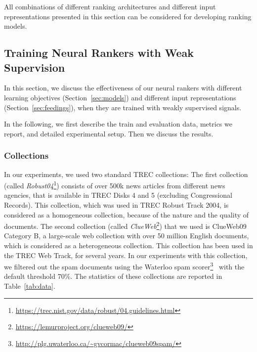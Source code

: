 \medskip
All combinations of different ranking architectures and different input representations presented in this section can be considered for developing ranking models.

\subsection{Training Neural Rankers with Weak Supervision}
\label{sec:neuralranking_expermients}
In this section,  we discuss the effectiveness of our neural rankers with different learning objectives (Section~\ref{sec:models}) and different input representations (Section~\ref{sec:feedings}), when they are trained with weakly supervised signals.

In the following, we first describe the train and evaluation data, metrics we report, and detailed experimental setup. Then we discuss the results.


\subsubsection{Collections}
\label{sec:collections}
In our experiments, we used two standard TREC collections: The first collection (called \emph{Robust04}\footnote{\url{https://trec.nist.gov/data/robust/04.guidelines.html}}) consists of over 500k news articles from different news agencies, that is available in TREC Disks 4 and 5 (excluding Congressional Records). This collection, which was used in TREC Robust Track 2004, is considered as a homogeneous collection, because of the nature and the quality of documents. The second collection (called \emph{ClueWeb}\footnote{\url{https://lemurproject.org/clueweb09/}}) that we used is ClueWeb09 Category B, a large-scale web collection with over 50 million English documents, which is considered as a heterogeneous collection. This collection has been used in the TREC Web Track, for several years. In our experiments with this collection, we filtered out the spam documents using the Waterloo spam scorer\footnote{\url{http://plg.uwaterloo.ca/~gvcormac/clueweb09spam/}}~\citep{Cormack:2011} with the default threshold $70\%$. The statistics of these collections are reported in Table~\ref{tab:data}. 

